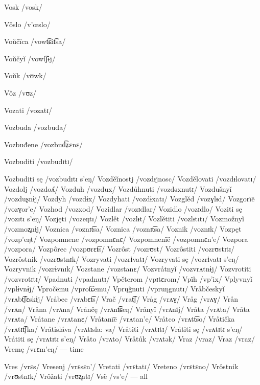 Vosk /vosk/

Vöslo /v’œslo/

Voŭčïca /vowt͡ɕit͡sa/

Voŭčyǐ /vowt͡ʃɨj/

Voŭk /vʊwk/

Vôz /vʊz/

Vozati /vozatɪ/

Vozbuda /vozbuda/

Vozbuđene /vozbud͡ʑɛnɛ/

Vozbuditi /vozbudɪtɪ/

Vozbuditi sę /vozbudɪtɪ s’eŋ/
Vozděǐnostj /vozdᵻjnosc/
Vozdělovati /vozdᵻlovatɪ/
Vozdolj /vozdoʎ/
Vozduh /vozdux/
Vozdůhnuti /vozdəxnutɪ/
Vozdušnyǐ /vozduʂnɨj/
Vozdyh /vozdɨx/
Vozdyhati /vozdɨxatɪ/
Vozglěd /vozɣlᵻd/
Vozgorïë /vozɣor’e/
Vozhod /vozxod/
Vozidlar /vozɪdlar/
Vozidlo /vozɪdlo/
Voziti sę /vozɪtɪ s’eŋ/
Vozjęti /vozeŋtɪ/
Vozlět /vozlᵻt/
Vozlětiti /vozlᵻtɪtɪ/
Vozmožnyǐ /vozmoʐnɨj/
Voznica /voznɪt͡sa/
Voznica /voznɪt͡sa/
Voznik /voznɪk/
Vozpęt /vozp’eŋt/
Vozpomnene /vozpomnɛnɛ/
Vozpomnenïë /vozpomnɛn’e/
Vozpora /vozpora/
Vozpôrec /vozpʊrɛt͡s/
Vozrôst /vozrʊst/
Vozrôstiti /vozrʊstɪtɪ/
Vozrôstnik /vozrʊstnɪk/
Vozryvati /vozrɨvatɪ/
Vozryvati sę /vozrɨvatɪ s’eŋ/
Vozryvnik /vozrɨvnɪk/
Vozstane /vozstanɛ/
Vozvråtnyǐ /vozvrʌtnɨj/
Vozvrotiti /vozvrotɪtɪ/
Vpadnuti /vpadnutɪ/
Vpěterom /vpᵻtɛrom/
Vpïh /vp’ix/
Vplyvnyǐ /vplɨvnɨj/
Vpročëmu /vprot͡ɕemu/
Vprųĝnuti /vpruŋgnutɪ/
Vråbčeskyǐ /vrʌbt͡ʃɛskɨj/
Vråbec /vrʌbɛt͡s/
Vrač /vrat͡ʃ/
Vråg /vrʌɣ/
Vråg /vrʌɣ/
Vrån /vrʌn/
Vråna /vrʌna/
Vrånčę /vrʌnt͡ɕeŋ/
Vrånyǐ /vrʌnɨj/
Vråta /vrʌta/
Vråta /vrʌta/
Vråtane /vrʌtanɛ/
Vråtanïë /vrʌtan’e/
Vråtco /vrʌtt͡so/
Vråtička /vrʌtɪt͡ʃka/
Vråtisláva /vrʌtɪsla: va/
Vråtiti /vrʌtɪtɪ/
Vråtiti sę /vrʌtɪtɪ s’eŋ/
Vråtiti sę /vrʌtɪtɪ s’eŋ/
Vråto /vrʌto/
Vråtůk /vrʌtək/
Vraz /vraz/
Vraz /vraz/
Vremę /vrɛm’eŋ/ — time

Vres /vrɛs/
Vresenj /vrɛsɛn’/
Vretati /vrɛtatɪ/
Vreteno /vrɛtɛno/
Vrôstnik /vrʊstnɪk/
Vrôžati /vrʊʐatɪ/
Vsë /vs’e/ — all

